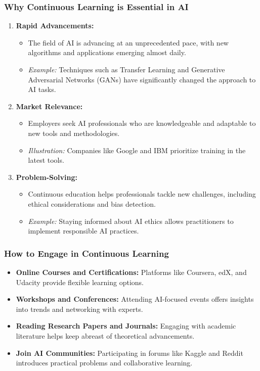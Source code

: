 \documentclass[aspectratio=169]{beamer}
\begin{document}
\begin{frame}[fragile]
    \frametitle{Why Continuous Learning is Essential in AI}
    \begin{enumerate}
        \item \textbf{Rapid Advancements:}
        \begin{itemize}
            \item The field of AI is advancing at an unprecedented pace, with new algorithms and applications emerging almost daily.
            \item \textit{Example:} Techniques such as Transfer Learning and Generative Adversarial Networks (GANs) have significantly changed the approach to AI tasks.
        \end{itemize}
        
        \item \textbf{Market Relevance:}
        \begin{itemize}
            \item Employers seek AI professionals who are knowledgeable and adaptable to new tools and methodologies.
            \item \textit{Illustration:} Companies like Google and IBM prioritize training in the latest tools.
        \end{itemize}
        
        \item \textbf{Problem-Solving:}
        \begin{itemize}
            \item Continuous education helps professionals tackle new challenges, including ethical considerations and bias detection.
            \item \textit{Example:} Staying informed about AI ethics allows practitioners to implement responsible AI practices.
        \end{itemize}
    \end{enumerate}
\end{frame}

\begin{frame}[fragile]
    \frametitle{How to Engage in Continuous Learning}
    \begin{itemize}
        \item \textbf{Online Courses and Certifications:} Platforms like Coursera, edX, and Udacity provide flexible learning options.
        \item \textbf{Workshops and Conferences:} Attending AI-focused events offers insights into trends and networking with experts.
        \item \textbf{Reading Research Papers and Journals:} Engaging with academic literature helps keep abreast of theoretical advancements.
        \item \textbf{Join AI Communities:} Participating in forums like Kaggle and Reddit introduces practical problems and collaborative learning.
    \end{itemize}
\end{frame}
\end{document}
